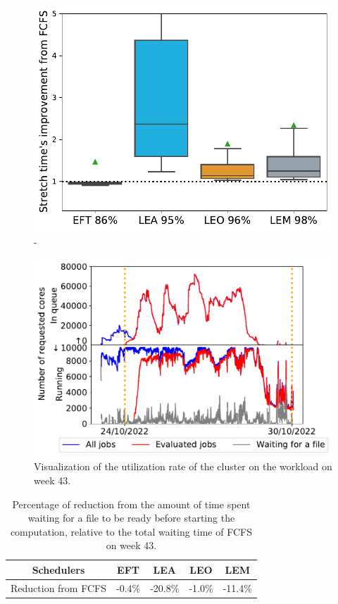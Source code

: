\documentclass[sigconf,review,anonymous]{acmart}
\begin{document}
\begin{figure}[t]\centering\includegraphics[width=0.9\linewidth]{../MBSS/plot/Boxplot/byuser/box_plot_stretch_10-24-10-30_0.pdf}\caption{-}\label{stretch.43}\end{figure}
\begin{figure}[t]\centering\includegraphics[width=0.9\linewidth]{../MBSS/plot/Cluster_usage/2022-10-24->2022-10-30_V10000_anonymous_Fcfs_Used_nodes_450_128_32_256_4_1024_core_by_core.pdf}\caption{Visualization of the utilization rate of the cluster on the workload on week 43.}\label{cluster_usage.43}\end{figure}
\begin{table}
\begin{tabular}{ |c|c|c|c|c| }
  \hline
  Schedulers & EFT & LEA & LEO & LEM \\
  \hline
  Reduction from FCFS & -0.4\% & -20.8\% & -1.0\% & -11.4\% \\
  \hline
\end{tabular}
\caption{Percentage of reduction from the amount of time spent 
waiting for a file to be ready before starting the computation,
relative to the total waiting time of FCFS on week 43.}\label{tab.43}
\end{table}
\end{document}
